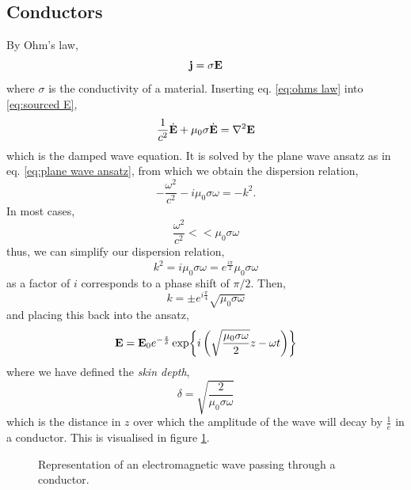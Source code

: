\documentclass{book}
\begin{document}
\subsection{Conductors}
By Ohm's law,
\begin{equation}
	\vb{j} = \sigma \vb{E} \label{eq:ohms law}
\end{equation}
where $\sigma$ is the conductivity of a material. Inserting eq. \eqref{eq:ohms law} into \eqref{eq:sourced E}, 
\begin{equation}
	\frac{1}{c^2}\Dot{\vb{E}} + \mu_0\sigma \Dot{\vb{E}} = \laplacian{\vb{E}}
\end{equation} 
which is the damped wave equation. It is solved by the plane wave ansatz as in eq. \eqref{eq:plane wave ansatz}, from which we obtain the dispersion relation,
\begin{equation}
	-\frac{\omega^2}{c^2} - i\mu_0 \sigma \omega = - k^2. \label{eq:dispersion}
\end{equation}
In most cases,
\begin{equation}
	\frac{\omega^2}{c^2} << \mu_0 \sigma \omega
\end{equation}
thus, we can simplify our dispersion relation,
\begin{equation}
	k^2 = i \mu_0 \sigma \omega = e^{\frac{i\pi}{2}}\mu_0 \sigma \omega
\end{equation}
as a factor of $i$ corresponds to a phase shift of $\pi / 2$. Then,
\begin{equation}
	k = \pm e^{i\frac{\pi}{4}}\sqrt{\mu_0 \sigma \omega} 
\end{equation}
and placing this back into the ansatz,
\begin{equation}
	\vb{E} = \vb{E}_0 e^{-\frac{z}{\delta}}\exp{i\left(\sqrt{\dfrac{\mu_0\sigma\omega}{2}} z - \omega t\right)}
\end{equation}
where we have defined the \textit{skin depth},
\begin{equation}
	\delta = \sqrt{\frac{2}{\mu_0 \sigma \omega}}
\end{equation}
which is the distance in $z$ over which the amplitude of the wave will decay by $\frac{1}{e}$ in a conductor. This is visualised in figure \ref{fig:skin}.
\begin{figure}
	\centering
	\caption{Representation of an electromagnetic wave passing through a conductor.}
	\label{fig:skin}
\end{figure}
\end{document}
